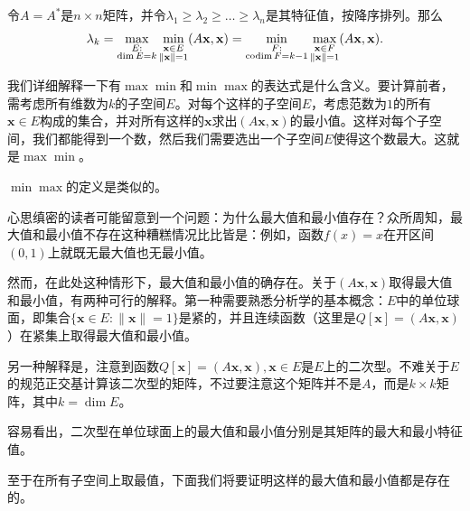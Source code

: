 \begin{theorem}[特征值的极小极大刻画]\label{thm:minmax}
  令$A=A^*$是$n\times n$矩阵，并令$\lambda_1\geq\lambda_2\geq\ldots\geq\lambda_n$是其特征值，按降序排列。那么
  \[\lambda_k=\max_{\begin{subarray}{c}E:\\ \dim E=k \end{subarray}}\min_{\begin{subarray}{c}\mathbf{x}\in E\\ \|\mathbf{x}\|=1 \end{subarray}}(A\mathbf{x},\mathbf{x})=\min_{\begin{subarray}{c}F:\\ \operatorname{codim} F=k-1 \end{subarray}}\max_{\begin{subarray}{c}\mathbf{x}\in F\\ \|\mathbf{x}\|=1\end{subarray}}(A\mathbf{x},\mathbf{x}).\]
\end{theorem}

我们详细解释一下有$\max\min$和$\min\max$的表达式是什么含义。要计算前者，需考虑所有维数为$k$的子空间$E$。对每个这样的子空间$E$，考虑范数为$1$的所有$\mathbf{x}\in E$构成的集合，并对所有这样的$\mathbf{x}$求出$(A\mathbf{x},\mathbf{x})$的最小值。这样对每个子空间，我们都能得到一个数，然后我们需要选出一个子空间$E$使得这个数最大。这就是$\max \min$。

$\min\max$的定义是类似的。

\begin{remark*}
  心思缜密的读者可能留意到一个问题：为什么最大值和最小值存在？众所周知，最大值和最小值不存在这种糟糕情况比比皆是：例如，函数$f(x)=x$在开区间$(0,1)$上就既无最大值也无最小值。

  然而，在此处这种情形下，最大值和最小值的确存在。关于$(A\mathbf{x},\mathbf{x})$取得最大值和最小值，有两种可行的解释。第一种需要熟悉分析学的基本概念：$E$中的单位球面，即集合$\{\mathbf{x}\in E:\|\mathbf{x}\|=1\}$是紧的，并且连续函数（这里是$Q[\mathbf{x}]=(A\mathbf{x},\mathbf{x})$）在紧集上取得最大值和最小值。

  另一种解释是，注意到函数$Q[\mathbf{x}]=(A\mathbf{x},\mathbf{x}),\mathbf{x}\in E$是$E$上的二次型。不难关于$E$的规范正交基计算该二次型的矩阵，不过要注意这个矩阵并不是$A$，而是$k\times k$矩阵，其中$k=\dim E$。

  容易看出，二次型在单位球面上的最大值和最小值分别是其矩阵的最大和最小特征值。

  至于在所有子空间上取最值，下面我们将要证明这样的最大值和最小值都是存在的。
\end{remark*}

